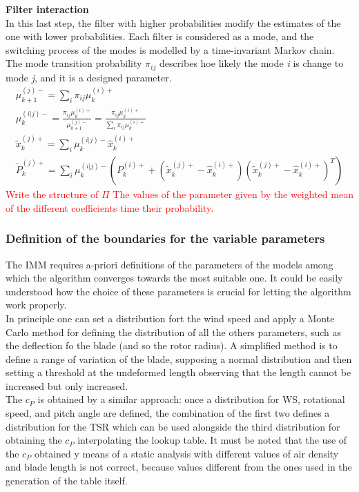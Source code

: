 \textbf{Filter interaction}\\
In this last step, the filter with higher probabilities modify the estimates of the one with lower probabilities. Each filter is considered as a mode, and the switching process of the modes is modelled by a time-invariant Markov chain. The mode transition probability $\pi_{ij}$ describes hoe likely the mode \textit{i} is change to mode \textit{j}, and it is a designed parameter. 
\begin{gather}
  \mu_{k+1}^{(j)-} = \sum_i \pi_{ij}\mu_k^{(i)+}\\
  \mu_k^{(i|j)-} = \frac{\pi_{ij}\mu_k^{(i)+}}{\mu_{k+1}^{(j)-}} = \frac{\pi_{ij}\mu_k^{(i)+}}{\sum_i \pi_{ij}\mu_k^{(i)+}}\\
  \tilde{x}_k^{(j)+} = \sum_i \mu_k^{(i|j)-} \hat{x}_k^{(i)+}\\
  \tilde{P}_k^{(j)+} = \sum_i \mu_k^{(i|j)-} \left(P_k^{(i)+} + \left(\tilde{x}_k^{(j)+} - \hat{x}_k^{(i)+}\right)\left(\tilde{x}_k^{(j)+} - \hat{x}_k^{(i)+}\right)^T\right)
\end{gather}
\textcolor{red}{Write the structure of $\Pi$}
\textcolor{red}{The values of the parameter given by the weighted mean of the different coefficients time their probability.}

\subsubsection{Definition of the boundaries for the variable parameters}
The IMM requires a-priori definitions of the parameters of the models among which the algorithm converges towards the most suitable one. It could be easily understood how the choice of these parameters is crucial for letting the algorithm work properly.\\ 
In principle one can set a distribution fort the wind speed and apply a Monte Carlo method for defining the distribution of all the others parameters, such as the deflection fo the blade (and so the rotor radius). A simplified method is to define a range of variation of the blade, supposing a normal distribution and then setting a threshold at the undeformed length observing that the length cannot be increased but only increased. \\
The $c_P$ is obtained by a similar approach: once a distribution for WS, rotational speed, and pitch angle are defined, the combination of the first two defines a distribution for the TSR which can be used alongside the third distribution for obtaining the $c_P$ interpolating the lookup table. It must be noted that the use of the $c_P$ obtained y means of a static analysis with different values of air density and blade length is not correct, because values different from the ones used in the generation of the table itself. 

